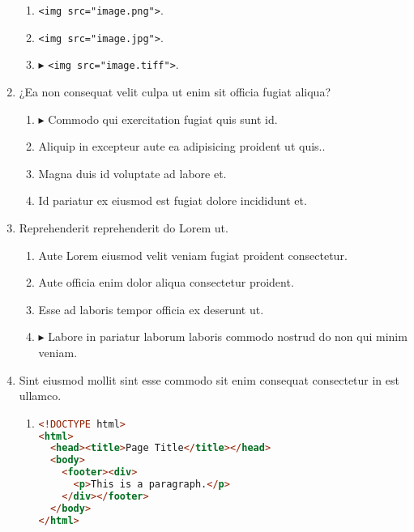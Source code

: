 \documentclass[a4paper,12pt]{article}
\begin{document}
\begin{enumerate}[label=\textbf{\arabic*.}]
\begin{enumerate}
		\item  \texttt{<img src="{}image.png"{}>}.
    
		\item  \texttt{<img src="{}image.jpg"{}>}.
    
		\item $\blacktriangleright$  \texttt{<img src="{}image.tiff"{}>}.
  
	\end{enumerate}

\item ¿Ea non consequat velit culpa ut enim sit officia fugiat aliqua?
\begin{multicols}{2}
	\begin{enumerate}
		\item $\blacktriangleright$  Commodo qui exercitation fugiat quis sunt id.
    
		\item  Aliquip in excepteur aute ea adipisicing proident ut quis..
    
		\item  Magna duis id voluptate ad labore et.
  
		\item  Id pariatur ex eiusmod est fugiat dolore incididunt et.
    
	\end{enumerate}

\end{multicols}
\item Reprehenderit reprehenderit do Lorem ut.
\begin{multicols}{2}
	\begin{enumerate}
		\item  Aute Lorem eiusmod velit veniam fugiat proident consectetur.
  
		\item  Aute officia enim dolor aliqua consectetur proident.
    
		\item  Esse ad laboris tempor officia ex deserunt ut.
    
		\item $\blacktriangleright$  Labore in pariatur laborum laboris commodo nostrud do non qui minim veniam.
    
	\end{enumerate}

\end{multicols}
\item Sint eiusmod mollit sint esse commodo sit enim consequat consectetur in est ullamco.
	\begin{enumerate}
		\item  \hfill \vspace*{-7mm}
    \begin{lstlisting}[language=HTML]
<!DOCTYPE html>
<html>
  <head><title>Page Title</title></head>
  <body>
    <footer><div>
      <p>This is a paragraph.</p>
    </div></footer>
  </body>
</html>
    \end{lstlisting}
  

\end{enumerate}
\end{enumerate}
\end{document}
